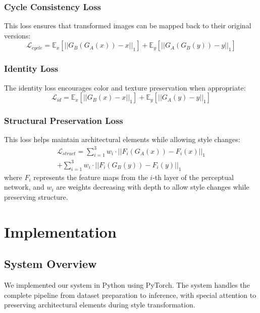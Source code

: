 \documentclass[twocolumn,superscriptaddress,aps]{revtex4-1}
\begin{document}
\subsubsection{Cycle Consistency Loss}
This loss ensures that transformed images can be mapped back to their original versions:
\begin{equation}
\mathcal{L}_{cycle} = \mathbb{E}_{x}[||G_B(G_A(x)) - x||_1] + \mathbb{E}_{y}[||G_A(G_B(y)) - y||_1]
\end{equation}

\subsubsection{Identity Loss}
The identity loss encourages color and texture preservation when appropriate:
\begin{equation}
\mathcal{L}_{id} = \mathbb{E}_{x}[||G_B(x) - x||_1] + \mathbb{E}_{y}[||G_A(y) - y||_1]
\end{equation}

\subsubsection{Structural Preservation Loss}
This loss helps maintain architectural elements while allowing style changes:
\begin{equation}
\begin{aligned}
\mathcal{L}_{struct} = \sum_{i=1}^{3} w_i \cdot ||F_i(G_A(x)) - F_i(x)||_1 \\
+ \sum_{i=1}^{3} w_i \cdot ||F_i(G_B(y)) - F_i(y)||_1
\end{aligned}
\end{equation}
where $F_i$ represents the feature maps from the $i$-th layer of the perceptual network, and $w_i$ are weights decreasing with depth to allow style changes while preserving structure.

\section{Implementation}

\subsection{System Overview}

We implemented our system in Python using PyTorch. The system handles the complete pipeline from dataset preparation to inference, with special attention to preserving architectural elements during style transformation.
\end{document}
